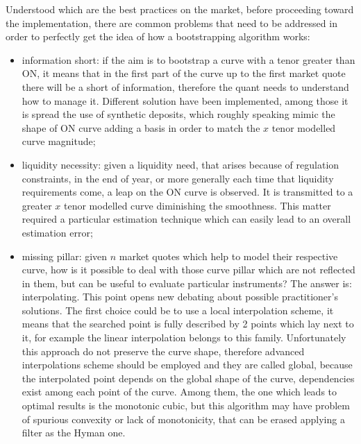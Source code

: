 Understood which are the best practices on the market, before proceeding toward the implementation, there are common problems that need to be addressed in order to perfectly get the idea of how a bootstrapping algorithm works:

\begin{itemize}

\item information short: if the aim is to bootstrap a curve with a tenor greater than ON, it means that in the first part of the curve up to the first market quote there will be a short of information, therefore the 
quant needs to understand how to manage it. Different solution have been implemented, among those it is spread the use of synthetic deposits, which roughly speaking mimic the shape of ON curve adding a basis in order to match the $x$ tenor modelled curve magnitude; 

\item liquidity necessity: given a liquidity need, that arises because of regulation constraints, in the end of year, or more generally each time that liquidity requirements come, a leap on the ON curve is observed. It is transmitted to a greater $x$ tenor modelled curve diminishing the smoothness. This matter required a particular estimation technique which can easily lead to an overall estimation error;

\item missing pillar: given $n$ market quotes which help to model their respective curve, how is it possible to deal with those curve pillar which are not reflected in them, but can be useful to evaluate particular instruments? The answer is: interpolating. This point opens new debating about possible practitioner's solutions. The first choice could be to use a local interpolation scheme, it means that the searched point is fully described by 2 points which lay next to it, for example the linear interpolation belongs to this family. Unfortunately this approach do not preserve the curve shape, therefore advanced interpolations scheme should be employed and they are called global, because the interpolated point depends on the global shape of the curve, dependencies exist among each point of the curve. Among them, the one which leads to optimal results is the monotonic cubic, but this algorithm may have problem of spurious convexity or lack of monotonicity, that can be erased applying a filter as the Hyman one.

\end{itemize}

